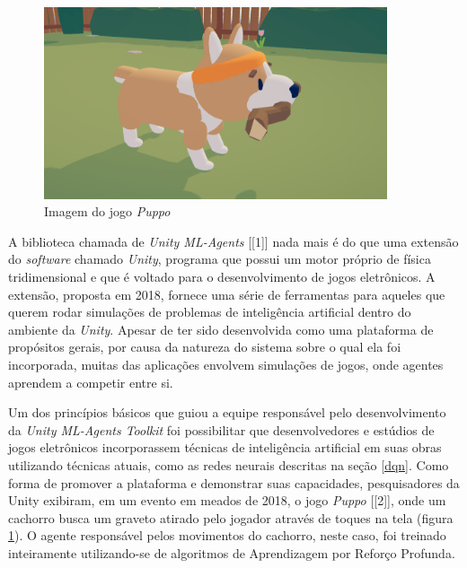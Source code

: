 \documentclass[cic,tc]{iiufrgs}
\begin{document}
\begin{figure}[h]
    \caption{Imagem do jogo \textit{Puppo}}
    \begin{center}
      \includegraphics[width=0.9\textwidth]{puppo.png}
    \end{center}
    \label{fig:puppo}
\end{figure}


A biblioteca chamada de \textit{Unity ML-Agents} [[1]] nada mais é do que uma
extensão do \textit{software} chamado \textit{Unity}, programa que possui um
motor próprio de física tridimensional e que é voltado para o desenvolvimento de
jogos eletrônicos. A extensão, proposta em 2018, fornece uma série de
ferramentas para aqueles que querem rodar simulações de problemas de
inteligência artificial dentro do ambiente da \textit{Unity}. Apesar de ter sido
desenvolvida como uma plataforma de propósitos gerais, por causa da natureza
do sistema sobre o qual ela foi incorporada, muitas das aplicações envolvem
simulações de jogos, onde agentes aprendem a competir entre si.


Um dos princípios básicos que guiou a equipe responsável pelo desenvolvimento
da \textit{Unity ML-Agents Toolkit} foi possibilitar que desenvolvedores e
estúdios de jogos eletrônicos incorporassem técnicas de inteligência artificial
em suas obras utilizando técnicas atuais, como as redes neurais descritas na
seção \ref{dqn}. Como forma de promover a plataforma e demonstrar suas capacidades,
pesquisadores da Unity exibiram, em um evento em meados de 2018, o jogo
\textit{Puppo} [[2]], onde um cachorro busca um graveto atirado pelo jogador
através de toques na tela (figura \ref{fig:puppo}). O agente responsável pelos
movimentos do cachorro, neste caso, foi treinado inteiramente utilizando-se de
algoritmos de Aprendizagem por Reforço Profunda.
\end{document}
